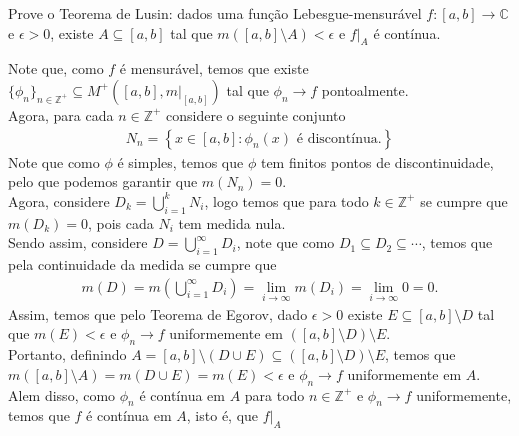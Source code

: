 \begin{homeworkProblem}[4]
  Prove o Teorema de Lusin: dados uma função Lebesgue-mensurável $f:[a,b]\to\mathbb{C}$ e $\epsilon>0$, existe $A\subseteq [a,b]$ tal que $m([a,b]\setminus A)<\epsilon$ e $f\big|_{A}$ é contínua. 
  \begin{solution}
    Note que, como $f$ é mensurável, temos que existe $\{\phi_n\}_{n\in\mathbb{Z}^{+}}\subseteq M^{+}([a,b],m\big|_{[a,b]})$ tal que $\phi_n\to f$ pontoalmente.\\
    Agora, para cada $n\in\mathbb{Z}^{+}$ considere o seguinte conjunto
    \begin{align*}
      N_n=\left\{ x\in[a,b]:\phi_n(x) \text{ é discontínua}. \right\}
    \end{align*}
    Note que como $\phi$ é simples, temos que $\phi$ tem finitos pontos de discontinuidade, pelo que podemos garantir que $m(N_n)=0$.\\
    Agora, considere $D_k=\bigcup_{i=1}^{k}N_i$, logo temos que para todo $k\in\mathbb{Z}^{+}$ se cumpre que $m(D_k)=0$, pois cada $N_i$ tem medida nula.\\
    Sendo assim, considere $D=\bigcup_{i=1}^{\infty}D_i$, note que como $D_1\subseteq D_2\subseteq\cdots$, temos que pela continuidade da medida se cumpre que
    \begin{align*}
      m(D)=m\left( \bigcup_{i=1}^{\infty}D_i \right)=\lim_{i \to \infty}m(D_i)=\lim_{i \to \infty}0=0.      
    \end{align*}
    Assim, temos que pelo Teorema de Egorov, dado $\epsilon>0$ existe $E\subseteq[a,b]\setminus D$ tal que $m\left(E\right)<\epsilon$ e $\phi_n\to f$ uniformemente em $([a,b]\setminus D)\setminus E$.\\
    Portanto, definindo $A=[a,b]\setminus (D\cup E)\subseteq ([a,b]\setminus D)\setminus E$, temos que $m([a,b]\setminus A)= m(D\cup E)=m(E)<\epsilon$ e $\phi_n\to f$ uniformemente em $A$. Alem disso, como $\phi_n$ é contínua em $A$ para todo $n\in\mathbb{Z}^{+}$ e $\phi_n\to f$ uniformemente, temos que $f$ é contínua em $A$, isto é, que $f\big|_A$ 
  \end{solution}
\end{homeworkProblem}
